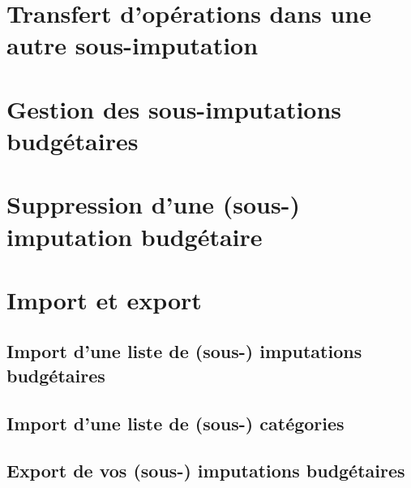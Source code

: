 \section{Transfert d'opérations dans une autre sous-imputation\label{budgetarylines-transfer}}


\section{Gestion des sous-imputations budgétaires\label{budgetarylines-management}}


\section{Suppression d'une (sous-) imputation budgétaire\label{budgetarylines-delete}}


\section{Import et export\label{budgetarylines-importexport}}


\subsection{Import d'une liste de (sous-) imputations budgétaires\label{budgetarylines-importexport-import} }

\subsection{Import d'une liste de (sous-) catégories\label{budgetarylines-importexport-importCategories} }

\subsection{Export de vos (sous-) imputations budgétaires\label{budgetarylines-importexport-budgetary}}



